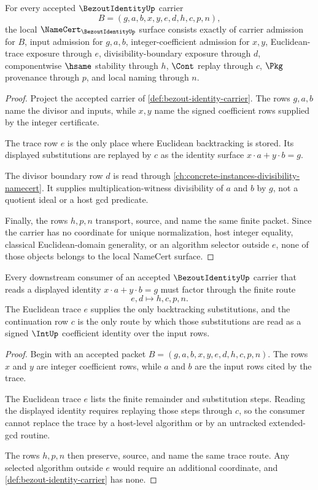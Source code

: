 \begin{theorem}
\label{thm:bezout-identity-namecert-obligations}
For every accepted $\BezoutIdentityUp$ carrier
$$
B=(g,a,b,x,y,e,d,h,c,p,n),
$$
the local $\NameCert_{\BezoutIdentityUp}$ surface consists exactly of carrier admission for $B$, input admission for $g,a,b$, integer-coefficient admission for $x,y$, Euclidean-trace exposure through $e$, divisibility-boundary exposure through $d$, componentwise $\hsame$ stability through $h$, $\Cont$ replay through $c$, $\Pkg$ provenance through $p$, and local naming through $n$.
\end{theorem}
\begin{proof}
Project the accepted carrier of \autoref{def:bezout-identity-carrier}. The rows $g,a,b$ name the divisor and inputs, while $x,y$ name the signed coefficient rows supplied by the integer certificate.

The trace row $e$ is the only place where Euclidean backtracking is stored. Its displayed substitutions are replayed by $c$ as the identity surface $x\cdot a+y\cdot b=g$.

The divisor boundary row $d$ is read through \autoref{ch:concrete-instances-divisibility-namecert}. It supplies multiplication-witness divisibility of $a$ and $b$ by $g$, not a quotient ideal or a host gcd predicate.

Finally, the rows $h,p,n$ transport, source, and name the same finite packet. Since the carrier has no coordinate for unique normalization, host integer equality, classical Euclidean-domain generality, or an algorithm selector outside $e$, none of those objects belongs to the local NameCert surface.
\end{proof}

\begin{theorem}
\label{thm:bezout-identity-euclidean-backtrack}
Every downstream consumer of an accepted $\BezoutIdentityUp$ carrier that reads a displayed identity $x\cdot a+y\cdot b=g$ must factor through the finite route
$$
e,d \longmapsto h,c,p,n .
$$
The Euclidean trace $e$ supplies the only backtracking substitutions, and the continuation row $c$ is the only route by which those substitutions are read as a signed $\IntUp$ coefficient identity over the input rows.
\end{theorem}
\begin{proof}
Begin with an accepted packet $B=(g,a,b,x,y,e,d,h,c,p,n)$. The rows $x$ and $y$ are integer coefficient rows, while $a$ and $b$ are the input rows cited by the trace.

The Euclidean trace $e$ lists the finite remainder and substitution steps. Reading the displayed identity requires replaying those steps through $c$, so the consumer cannot replace the trace by a host-level algorithm or by an untracked extended-gcd routine.

The rows $h,p,n$ then preserve, source, and name the same trace route. Any selected algorithm outside $e$ would require an additional coordinate, and \autoref{def:bezout-identity-carrier} has none.
\end{proof}

